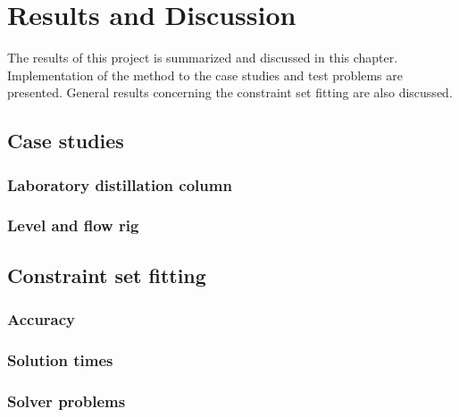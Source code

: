 \chapter{Results and Discussion}\label{chap:results}
\begin{overview}
  The results of this project is summarized and discussed in this chapter.
  Implementation of the method to the case studies and test problems are presented.
  General results concerning the constraint set fitting are also discussed.
\end{overview}

\section{Case studies}
\subsection{Laboratory distillation column}
\subsection{Level and flow rig}

\section{Constraint set fitting}
\subsection{Accuracy}
\subsection{Solution times}
\subsection{Solver problems}

